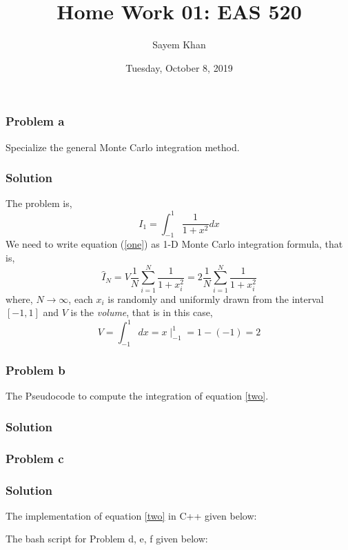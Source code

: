 \documentclass{article}
\title{Home Work 01: EAS 520}
\author{Sayem Khan}
\date{Tuesday, October 8, 2019}
\begin{document}
\maketitle

\subsubsection*{Problem a} 
Specialize the general Monte Carlo integration method.
\subsubsection*{Solution}
The problem is,
\begin{equation}
   I_1 = \int_{-1}^{1}\frac{1}{1+x^2}dx
   \label{one}
\end{equation}
We need to write equation (\ref{one}) as 1-D Monte Carlo integration formula, that is,
\begin{equation}
   \hat{I}_{N} = V\frac{1}{N}\sum_{i = 1}^{N}\frac{1}{1+x_i^2} =2\frac{1}{N}\sum_{i = 1}^{N}\frac{1}{1+x_i^2}
   \label{two}
\end{equation}
where, $N\to \infty $, each $x_i$ is randomly and uniformly drawn from the interval $\left [ -1,1 \right ]$ and $V$ is the \textit{volume}, that is in this case,
\begin{equation*}
  V = \int_{-1}^{1}dx = x\mid^{1}_{-1} = 1-(-1) = 2
\end{equation*}
\subsubsection*{Problem b } 
The Pseudocode to compute the integration of equation \ref{two}. 
\subsubsection*{Solution}


\subsubsection*{Problem c } 
\subsubsection*{Solution}
The implementation of equation \ref{two} in C++ given below:

\vspace{13mm}
The bash script for Problem d, e, f given below:

\end{document}
